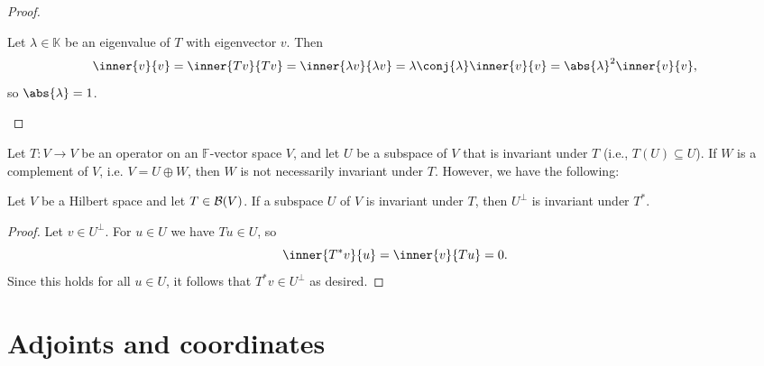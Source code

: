 \documentclass[article, a4paper, 11pt, oneside]{memoir}
\numberwithin{equation}{chapter}
\newcommand{\calL}{\mathcal{L}}
\newcommand{\calV}{\mathcal{V}}
\newcommand{\field}{\mathbb{F}}
\begin{document}
\begin{proof}
\begin{proofsec}

    \item[Proof of \subcref{enum:unitary-eigenvalues-unit-circle}]
    Let $\lambda \in \mathbb{K}$ be an eigenvalue of $T$ with eigenvector $v$. Then
    \begin{equation*}
        \inner{v}{v}
            = \inner{Tv}{Tv}
            = \inner{\lambda v}{\lambda v}
            = \lambda \conj{\lambda} \inner{v}{v}
            = \abs{\lambda}^2 \inner{v}{v},
    \end{equation*}
    so $\abs{\lambda} = 1$.
\end{proofsec}
\end{proof}

Let $T \colon V \to V$ be an operator on an $\field$-vector space $V$, and let $U$ be a subspace of $V$ that is invariant under $T$ (i.e., $T(U) \subseteq U$). If $W$ is a complement of $V$, i.e. $V = U \oplus W$, then $W$ is not necessarily invariant under $T$. However, we have the following:

\begin{lemma}
    \label{thm:adjoint-invariant-subspace}
    Let $V$ be a Hilbert space and let $T \in \mathcal{B}(V)$. If a subspace $U$ of $V$ is invariant under $T$, then $U^\perp$ is invariant under $T^*$.
\end{lemma}

\begin{proof}
    Let $v \in U^\perp$. For $u \in U$ we have $Tu \in U$, so
    \begin{equation*}
        \inner{T^*v}{u}
            = \inner{v}{Tu}
            = 0.
    \end{equation*}
    Since this holds for all $u \in U$, it follows that $T^*v \in U^\perp$ as desired.
\end{proof}


\section{Adjoints and coordinates}
\end{document}
